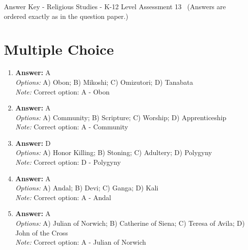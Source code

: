 \documentclass[12pt]{article}
\begin{document}
\begin{center}
Answer Key - Religious Studies - K-12 Level Assessment 13 \
\small (Answers are ordered exactly as in the question paper.)
\end{center}

\section*{Multiple Choice}
\begin{enumerate}[label=\arabic*.]
\item \textbf{Answer:} A
\\ \textit{Options:} A) Obon; B) Mikoshi; C) Omizutori; D) Tanabata
\\ \textit{Note:} Correct option: A - Obon
\item \textbf{Answer:} A
\\ \textit{Options:} A) Community; B) Scripture; C) Worship; D) Apprenticeship
\\ \textit{Note:} Correct option: A - Community
\item \textbf{Answer:} D
\\ \textit{Options:} A) Honor Killing; B) Stoning; C) Adultery; D) Polygyny
\\ \textit{Note:} Correct option: D - Polygyny
\item \textbf{Answer:} A
\\ \textit{Options:} A) Andal; B) Devi; C) Ganga; D) Kali
\\ \textit{Note:} Correct option: A - Andal
\item \textbf{Answer:} A
\\ \textit{Options:} A) Julian of Norwich; B) Catherine of Siena; C) Teresa of Avila; D) John of the Cross
\\ \textit{Note:} Correct option: A - Julian of Norwich
\end{enumerate}
\end{document}
